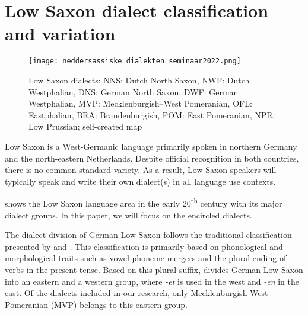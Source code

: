 \documentclass[output=paper,colorlinks,citecolor=brown]{langscibook}
\begin{document}

\section{Low Saxon dialect classification and variation}

\begin{figure}
    \texttt{[image: neddersassiske\_dialekten\_seminaar2022.png]}
    \caption{Low Saxon dialects: NNS: Dutch North Saxon, NWF: Dutch Westphalian, DNS: German North Saxon, DWF: German Westphalian, MVP: Mecklenburgish--West Pomeranian, OFL: Eastphalian, BRA: Brandenburgish, POM: East Pomeranian, NPR: Low Prussian; self-created map}
    \label{fig:dialect_map}
\end{figure}

Low Saxon is a West-Germanic language primarily spoken in northern Germany and the north-eastern Netherlands. Despite official recognition in both countries, there is no common standard variety. As a result, Low Saxon speakers will typically speak and write their own dialect(s) in all language use contexts. 

 shows the Low Saxon language area in the early 20\textsuperscript{th} century with its major dialect groups. In this paper, we will focus on the encircled dialects. 

The dialect division of German Low Saxon follows the traditional classification presented by \citet{Schroeder2004} and \citet{Stellmacher1983}. This classification is primarily based on phonological and morphological traits such as vowel phoneme mergers and the plural ending of verbs in the present tense. Based on this plural suffix, \citet[240]{Stellmacher1983} divides German Low Saxon into an eastern and a western group, where \textit{-et} is used in the west and \textit{-en} in the east. Of the dialects included in our research, only Mecklenburgish-West Pomeranian (MVP) belongs to this eastern group.
\end{document}
